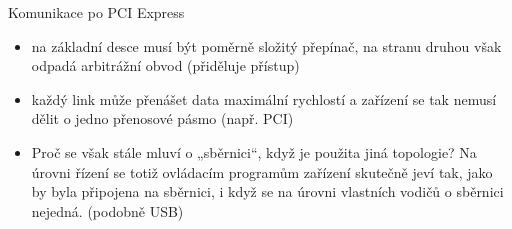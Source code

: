 \documentclass[aspectratio=43]{beamer}
\begin{document}
\begin{frame}{Komunikace po PCI Express}
	\begin{itemize}
		\item na základní desce musí být poměrně složitý přepínač, na stranu druhou však odpadá arbitrážní obvod (přiděluje přístup)
		\item každý link může přenášet data maximální rychlostí a zařízení se tak nemusí dělit o jedno přenosové pásmo (např. PCI)
		\item Proč se však stále mluví o „sběrnici“, když je použita jiná topologie? Na úrovni řízení se totiž ovládacím programům zařízení skutečně jeví tak, jako by byla připojena na sběrnici, i když se na úrovni vlastních vodičů o sběrnici nejedná. (podobně USB)
		      
	\end{itemize}
	
\end{frame}
\end{document}

